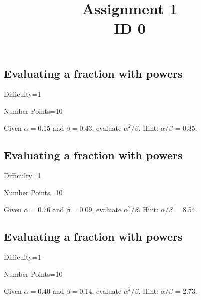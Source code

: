 \documentclass{article}
\title{Assignment 1 \\ ID 0}
\begin{document}
\maketitle

\section{} 



\subsection{Evaluating a fraction with powers}

Difficulty=1

Number Points=10

Given $\alpha = 0.15$ and $\beta = 0.43$, evaluate $\alpha^{2}/\beta$. Hint: $\alpha/\beta$ = 0.35.

\subsection{Evaluating a fraction with powers}

Difficulty=1

Number Points=10

Given $\alpha = 0.76$ and $\beta = 0.09$, evaluate $\alpha^{2}/\beta$. Hint: $\alpha/\beta$ = 8.54.

\subsection{Evaluating a fraction with powers}

Difficulty=1

Number Points=10

Given $\alpha = 0.40$ and $\beta = 0.14$, evaluate $\alpha^{2}/\beta$. Hint: $\alpha/\beta$ = 2.73.
\end{document}
